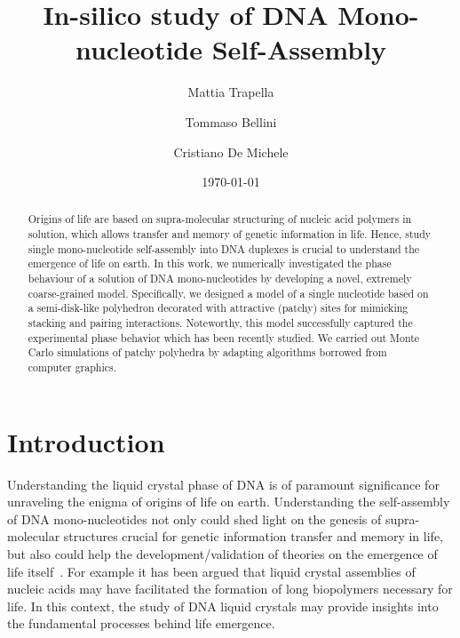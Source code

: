 \documentclass[aip,jcp, amsmath, amssymb, reprint]{revtex4-1}
\begin{document}
\title{In-silico study of DNA Mono-nucleotide Self-Assembly}
\date{\today}

\author{Mattia Trapella}

\author{Tommaso Bellini}
\author{Cristiano De Michele}

\begin{abstract}
  Origins of life are based on supra-molecular structuring
  of nucleic acid polymers in solution, which allows transfer and memory of genetic information in life. 
  Hence, study single mono-nucleotide self-assembly into DNA duplexes is crucial to understand 
  the emergence of life on earth.
  In this work, we numerically investigated the phase behaviour of a solution of DNA
  mono-nucleotides by developing a novel, extremely coarse-grained model. Specifically, 
  we designed a model of a single nucleotide based on a semi-disk-like polyhedron decorated with attractive 
  (patchy) sites for mimicking stacking and pairing interactions. Noteworthy, 
  this model successfully captured the experimental phase behavior which has been recently studied.
  We carried out Monte Carlo simulations of patchy polyhedra by adapting algorithms borrowed 
  from computer graphics.
\end{abstract}

\maketitle


\section{Introduction}
Understanding the liquid crystal phase of DNA is of paramount significance for unraveling the enigma of origins of life
on earth. Understanding the self-assembly of DNA mono-nucleotides not only could shed light on the genesis of 
supra-molecular structures crucial for genetic information transfer and memory in life, but also could help the 
development/validation of theories on the emergence of life itself~\cite{Jia}. 
For example it has been argued that  liquid crystal assemblies of nucleic acids may have facilitated the formation 
of long biopolymers necessary for life. In this context, the study of DNA liquid crystals may provide 
insights into the fundamental processes behind life emergence.  \\
\end{document}
